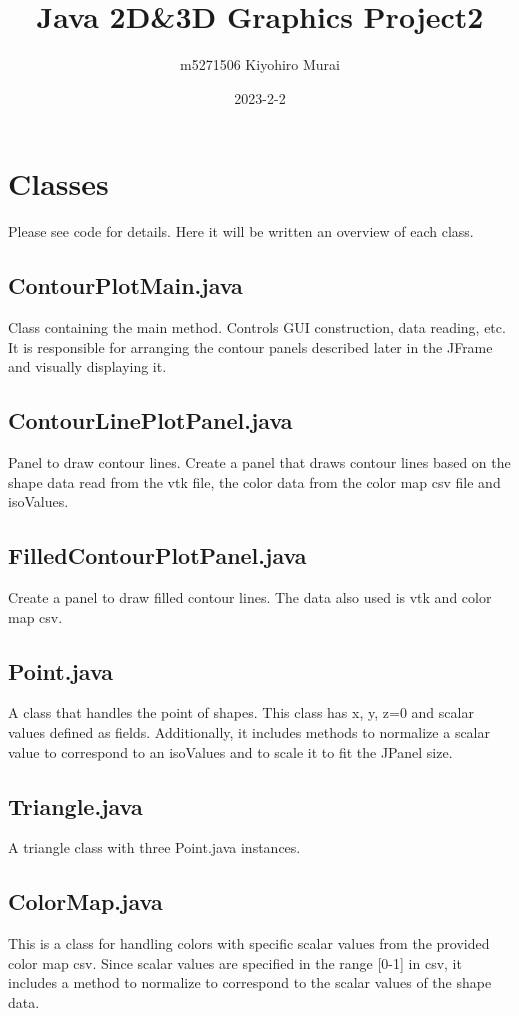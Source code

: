 \documentclass[12pt]{article}
\title{Java 2D\&3D Graphics Project2}
\author{m5271506 Kiyohiro Murai}
\date{2023-2-2}
\begin{document}
\maketitle
\tableofcontents
\newpage

\section{Classes}
Please see code for details. Here it will be written an overview of each class.
\subsection{ContourPlotMain.java}
Class containing the main method. Controls GUI construction, data reading, etc. It is responsible for arranging the contour panels described later in the JFrame and visually displaying it.
\subsection{ContourLinePlotPanel.java}
Panel to draw contour lines. Create a panel that draws contour lines based on the shape data read from the vtk file, the color data from the color map csv file and isoValues.
\subsection{FilledContourPlotPanel.java}
Create a panel to draw filled contour lines. The data also used is vtk and color map csv.
\subsection{Point.java}
A class that handles the point of shapes. This class has x, y, z=0 and scalar values defined as fields. Additionally, it includes methods to normalize a scalar value to correspond to an isoValues and to scale it to fit the JPanel size.
\subsection{Triangle.java}
A triangle class with three Point.java instances.
\subsection{ColorMap.java}
This is a class for handling colors with specific scalar values from the provided color map csv. Since scalar values are specified in the range [0-1] in csv, it includes a method to normalize to correspond to the scalar values of the shape data.
\end{document}
